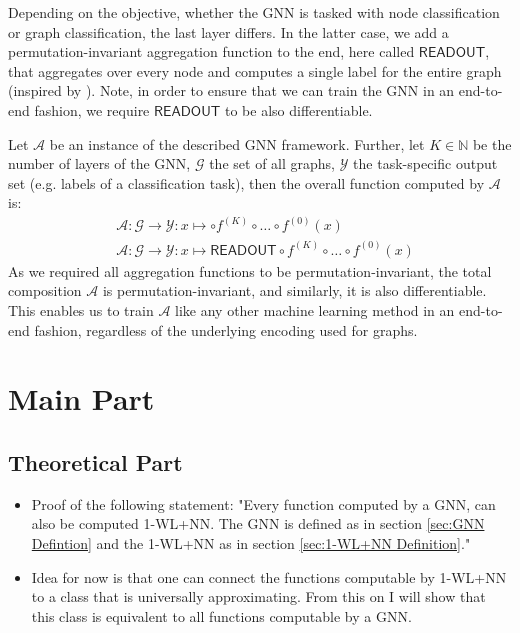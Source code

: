 \documentclass[11pt, dvipsnames, DIV=12]{scrreprt}
\theoremstyle{definition}
\begin{document}
\noindent Depending on the objective, whether the GNN is tasked with node classification or graph classification, the last layer differs. In the latter case, we add a permutation-invariant aggregation function to the end, here called $\textsf{READOUT}$, that aggregates over every node and computes a single label for the entire graph (inspired by \cite{Xu2018}). Note, in order to ensure that we can train the GNN in an end-to-end fashion, we require $\textsf{READOUT}$ to be also differentiable.

Let $\mathcal{A}$ be an instance of the described GNN framework. Further, let $K \in \mathbb{N}$ be the number of layers of the GNN, $\mathcal{G}$ the set of all graphs, $\mathcal{Y}$ the task-specific output set (e.g. labels of a classification task), then the overall function computed by $\mathcal{A}$ is:
\begin{align}
&\mathcal{A}: \mathcal{G} \rightarrow \mathcal{Y}: x \mapsto \circ f^{(K)} \circ \ldots \circ f^{(0)}(x)\\
&\mathcal{A}: \mathcal{G} \rightarrow \mathcal{Y}: x \mapsto \textsf{READOUT} \circ f^{(K)} \circ \ldots \circ f^{(0)}(x)
\end{align}
As we required all aggregation functions to be permutation-invariant, the total composition $\mathcal{A}$ is permutation-invariant, and similarly, it is also differentiable. This enables us to train $\mathcal{A}$ like any other machine learning method in an end-to-end fashion, regardless of the underlying encoding used for graphs.


\section{Main Part}
\subsection{Theoretical Part}
\begin{itemize}
    \item Proof of the following statement: "Every function computed by a GNN, can also be computed 1-WL+NN. The GNN is defined as in section \ref{sec:GNN Defintion} and the 1-WL+NN as in section \ref{sec:1-WL+NN Definition}."
    \item Idea for now is that one can connect the functions computable by 1-WL+NN to a class that is universally approximating. From this on I will show that this class is equivalent to all functions computable by a GNN. 
\end{itemize}
\end{document}
